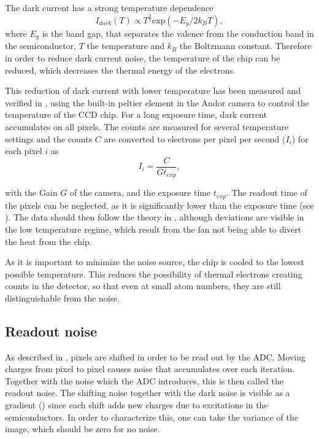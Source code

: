 The dark current has a strong temperature dependence\cite{Ottenstein2006}
\begin{equation}
\label{eq:darkcurrent}
I_{dark}(T) \propto T^{\frac{3}{2}} \mathrm{exp}(-E_g/2k_BT),
\end{equation}
where $E_g$ is the band gap, that separates the valence from the conduction band in the semiconductor, $T$ the temperature and $k_B$ the Boltzmann constant.
Therefore in order to reduce dark current noise, the temperature of the chip can be reduced, which decreases the thermal energy of the electrons.

This reduction of dark current with lower temperature has been measured and verified in , using the built-in peltier element in the Andor camera to control the temperature of the CCD chip. For a long exposure time, dark current accumulates on all pixels. The counts are measured for several temperature settings and the counts $C$ are converted to electrons per pixel per second ($I_i$)\cite{Ottenstein2006} for each pixel $i$ as
\begin{equation}
I_{i} = \frac{C}{G t_{exp}},
\end{equation}


with the Gain $G$ of the camera, and the exposure time $t_{exp}$. The readout time of the pixels can be neglected, as it is significantly lower than the exposure time (see ).
The data should then follow the theory in , although deviations are visible in the low temperature regime, which result from the fan not being able to divert the heat from the chip.

As it is important to minimize the noise source, the chip is cooled to the lowest possible temperature. This reduces the possibility of thermal electrons creating counts in the detector, so that even at small atom numbers, they are still distinguishable from the noise.

\subsection{Readout noise}
\label{subsec:readoutnoise}
As described in , pixels are shifted in order to be read out by the ADC. Moving charges from pixel to pixel causes noise that accumulates over each iteration. Together with the noise which the ADC introduces, this is then called the readout noise. The shifting noise together with the dark noise is visible as a gradient () since each shift adds new charges due to excitations in the semiconductors. In order to characterize this, one can take the variance of the image, which should be zero for no noise.

